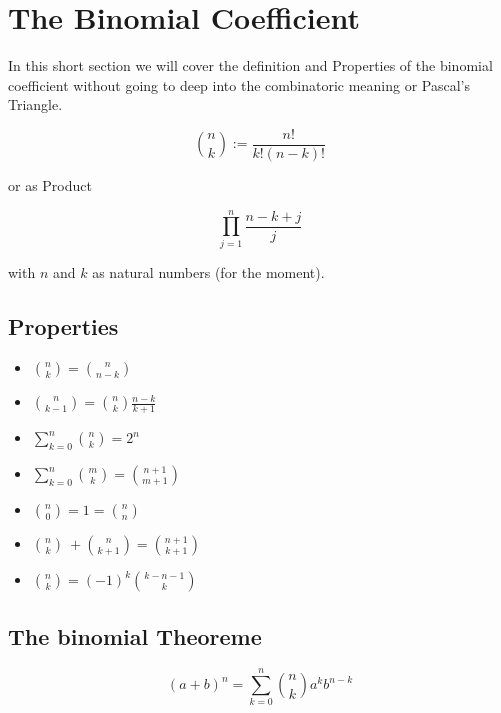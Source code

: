 \section{The Binomial Coefficient}

In this short section we will cover the definition and Properties of the binomial coefficient
without going to deep into the combinatoric meaning or Pascal's Triangle.

\[
\binom{n}{k} := \frac{n!}{k!(n-k)!}
\]

or as Product

\[
\prod_{j = 1}^{n} \frac{n-k+j}{j}
\]

with \(n\) and \(k\) as natural numbers (for the moment).

\subsection{Properties}

\begin{itemize}[label=\(-\)]
    \item \( \binom{n}{k} =  \binom{n}{n - k}\)
    \item \( \binom{n}{k - 1} = \binom{n}{k} \frac{n - k}{k + 1}\)
    \item \( \sum_{k = 0}^{n} \binom{n}{k} = 2^n\) 
    \item \( \sum_{k = 0}^{n} \binom{m}{k} = \binom{n + 1}{m + 1}\) 
    \item \(\binom{n}{0} = 1 = \binom{n}{n}\)
    \item \(\binom{n}{k}\ + \binom{n}{k + 1} = \binom{n + 1}{k + 1}\)
    \item \(\binom{n}{k} = (-1)^k \binom{k - n - 1}{k}\)
\end{itemize}

\subsection{The binomial Theoreme}
\[
    (a + b)^{n} =\sum_{k = 0}^{n}\binom{n}{k}a^k b^{n - k}
\]

\newpage


